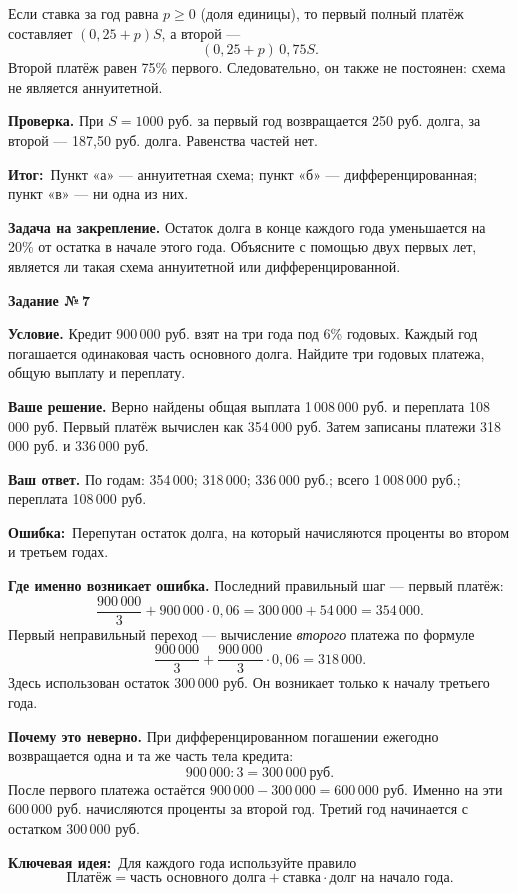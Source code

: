 \documentclass[a4paper,11pt]{article}
\newcommand{\wrong}{\textcolor{error}{\textbf{Ошибка:}}}
\newcommand{\idea}{\textcolor{deep}{\textbf{Ключевая идея:}}}
\newcommand{\result}{\textcolor{accent}{\textbf{Итог:}}}
\newcommand{\tasktitle}[1]{\phantomsection\label{task:#1}{\Large\color{deep}\textbf{Задание №\,#1}}\par\vspace{4mm}}
\begin{document}
Если ставка за год равна \(p\ge0\) (доля единицы), то первый полный платёж
составляет \((0{,}25+p)S\), а второй ---
\[
(0{,}25+p)\,0{,}75S.
\]
Второй платёж равен 75\% первого. Следовательно, он также не постоянен:
схема не является аннуитетной.

\textbf{Проверка.} При \(S=1000\) руб. за первый год возвращается
250 руб. долга, за второй --- 187{,}50 руб. долга. Равенства частей нет.

\result\ Пункт «а» --- аннуитетная схема; пункт «б» ---
дифференцированная; пункт «в» --- ни одна из них.

\textbf{Задача на закрепление.} Остаток долга в конце каждого года
уменьшается на 20\% от остатка в начале этого года. Объясните с помощью
двух первых лет, является ли такая схема аннуитетной или
дифференцированной.

\clearpage
\tasktitle{7}
{\textbf{Условие.}} Кредит 900\,000 руб. взят на три года под 6\% годовых.
Каждый год погашается одинаковая часть основного долга.
Найдите три годовых платежа, общую выплату и переплату.

\textbf{Ваше решение.} Верно найдены общая выплата 1\,008\,000 руб.
и переплата 108\,000 руб. Первый платёж вычислен как 354\,000 руб.
Затем записаны платежи 318\,000 руб. и 336\,000 руб.

\textbf{Ваш ответ.} По годам:
354\,000; 318\,000; 336\,000 руб.;
всего 1\,008\,000 руб.; переплата 108\,000 руб.

\wrong\ Перепутан остаток долга, на который начисляются проценты
во втором и третьем годах.

\textbf{Где именно возникает ошибка.} Последний правильный шаг ---
первый платёж:
\[
\frac{900\,000}{3}+900\,000\cdot0{,}06
=300\,000+54\,000=354\,000.
\]
Первый неправильный переход --- вычисление \emph{второго} платежа
по формуле
\[
\frac{900\,000}{3}+\frac{900\,000}{3}\cdot0{,}06
=318\,000.
\]
Здесь использован остаток 300\,000 руб. Он возникает только
к началу третьего года.

\textbf{Почему это неверно.} При дифференцированном погашении ежегодно
возвращается одна и та же часть тела кредита:
\[
900\,000:3=300\,000\ \text{руб.}
\]
После первого платежа остаётся \(900\,000-300\,000=600\,000\) руб.
Именно на эти 600\,000 руб. начисляются проценты за второй год.
Третий год начинается с остатком 300\,000 руб.

\idea\ Для каждого года используйте правило
\[
\text{Платёж}=
\text{часть основного долга}+
\text{ставка}\cdot\text{долг на начало года}.
\]
\end{document}
